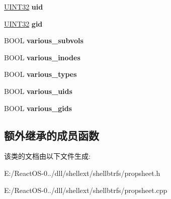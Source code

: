 \begin{DoxyCompactItemize}
\mbox{\label{class_btrfs_prop_sheet_ad35c771baedb009ad352267c12cf87c3}} 
\hyperlink{_processor_bind_8h_ae1e6edbbc26d6fbc71a90190d0266018}{U\+I\+N\+T32} {\bfseries uid}
\item 
\mbox{\label{class_btrfs_prop_sheet_aaa47c2d601760df5d71270f031f84a84}} 
\hyperlink{_processor_bind_8h_ae1e6edbbc26d6fbc71a90190d0266018}{U\+I\+N\+T32} {\bfseries gid}
\item 
\mbox{\label{class_btrfs_prop_sheet_a6ee8403aa0367ecc419406b0926eaeaa}} 
B\+O\+OL {\bfseries various\+\_\+subvols}
\item 
\mbox{\label{class_btrfs_prop_sheet_a89a8824eae2c7526be9b7b81d2a8cfa4}} 
B\+O\+OL {\bfseries various\+\_\+inodes}
\item 
\mbox{\label{class_btrfs_prop_sheet_ae49950a6bcaf5ea7d60974cc13e198a4}} 
B\+O\+OL {\bfseries various\+\_\+types}
\item 
\mbox{\label{class_btrfs_prop_sheet_aa7a044235f6a30b2acb44a4c008ba08b}} 
B\+O\+OL {\bfseries various\+\_\+uids}
\item 
\mbox{\label{class_btrfs_prop_sheet_a063216136e6b2e24d139ed17c7fea92a}} 
B\+O\+OL {\bfseries various\+\_\+gids}
\end{DoxyCompactItemize}
\subsection*{额外继承的成员函数}


该类的文档由以下文件生成\+:\begin{DoxyCompactItemize}
\item 
E\+:/\+React\+O\+S-\/0../dll/shellext/shellbtrfs/propsheet.\+h\item 
E\+:/\+React\+O\+S-\/0../dll/shellext/shellbtrfs/propsheet.\+cpp\end{DoxyCompactItemize}

